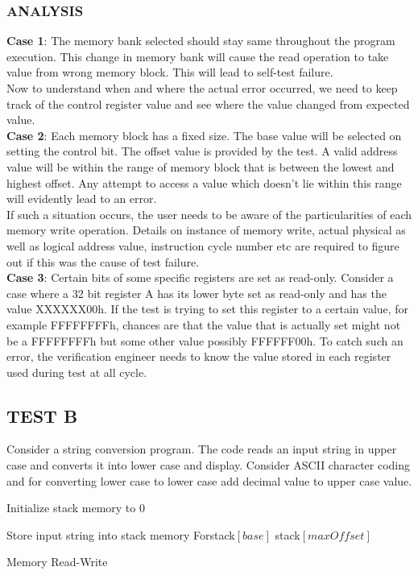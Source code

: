 \subsubsection{ANALYSIS}
{\bf Case 1}: The memory bank selected should stay same throughout the program execution. This change in memory bank will cause the read operation to take value from wrong memory block. This will lead to self-test failure. \\
 Now to understand when and where the actual error occurred, we need to keep track of the control register value and see where the value changed from expected value. \\
{\bf Case 2}: Each memory block has a fixed size. The base value will be selected on setting the control bit. The offset value is provided by the test. A valid address value will be within the range of memory block that is between the lowest and highest offset. Any attempt to access a value which doesn't lie within this range will evidently lead to an error.\\
If such a situation occurs, the user needs to be aware of the particularities of each memory write operation. Details on instance of memory write, actual physical as well as logical address value, instruction cycle number etc are required to figure out if this was the cause of test failure.\\
{\bf Case 3}: Certain bits of some specific registers are set as read-only. Consider a case where a 32 bit register A has its lower byte set as read-only and has the value XXXXXX00h. If the test is trying to set this register to a certain value, for example FFFFFFFFh, chances are that the value that is actually set might not be a FFFFFFFFh but some other value possibly FFFFFF00h. 
To catch such an error, the verification engineer needs to know the value stored in each register used during test at all cycle.



\subsection {TEST B}
Consider a string conversion program. The code reads an input string in upper case and converts it into lower case and display. Consider ASCII character coding and for converting lower case to lower case add decimal value to upper case value.

\vspace{1.5cm}
\IncMargin{1em}
\begin{algorithm}[H]
\DontPrintSemicolon
{}

\BlankLine
Initialize stack memory to 0 \;

	Store input string into stack memory\;
	For{stack$[base]$ \KwTo stack$[maxOffset]$}{\;
		
	}

\caption{Memory Read-Write}
\end{algorithm}\DecMargin{1em}

